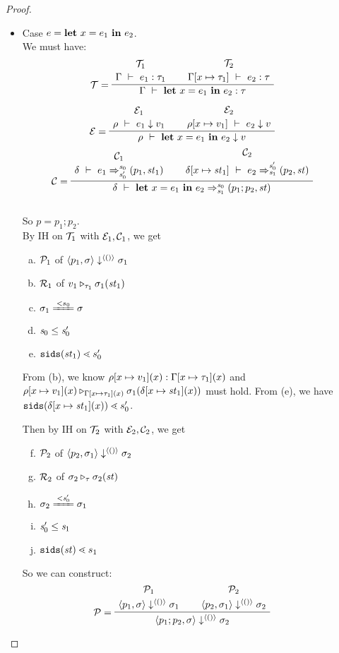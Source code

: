 \begin{proof}
\begin{itemize}
 
 \item \label{case-let} Case $e = \mathbf{let} \ x = e_1 \ \mathbf{in} \ e_2$. \\[1ex]
 We must have:
 $$\PT{
 	\UCN{\MT_1}{\Type{\Gam}{e_1}{\tau_1}}
 	\UCN{\MT_2}{\Type{\Gam[\Map{x}{\tau_1}]}{e_2}{\tau}}
 	\LeLa{\MT =} 
 	\BC{\Type{\Gam}{\Let{x}{e_1}{e_2}}{\tau}}
 }$$
 
 $$\PT{	
 	\UCN{\ME_1}{\Eval{\rho}{e_1}{v_1}}
 	\UCN{\ME_2}{\Eval{\rho[\Map{x}{v_1}]}{e_2}{v}}
 	\LeLa{\ME =} 
 	\BC{\Eval{\rho}{\Let{x}{e_1}{e_2}}{v}}
 }$$ 
 $$\PT{\UCN{\MC_1}{\Trans{\del}{e_1}{\s_0}{\s_0'}{\sfun{p_1}{\st_1}}}
 	\UCN{\MC_2}{\Trans{\del[x \|-> {\st_1}]}{e_2}{\s_0'}{\s_1}{\sfun {p_2} {\st}}}
 	\LeLa{\MC = }
 	\BC{\Trans{\del}{\Let{x}{e_1}{e_2}}{\s_0}{\s_1}{\sfun {p_1;p_2} {\st}}}
 }$$\\[1ex]
 
 So $p = p_1;p_2$. \\
 
 By IH on $\mathcal{T}_1$ with $\mathcal{E}_1,\mathcal{C}_1$, we get 
 \begin{enumerate}[(a)]
 	\item $\mathcal{P}_1$ of $\left\langle p_1,\sigma \right\rangle \downarrow^{\langle () \rangle} \sigma_1$
 	\item $\mathcal{R}_1$ of $v_1 \triangleright_{\tau_1} \sigma_1(\mathit{st}_1)$
 	\item $\sgm_1 \ConEq{s_0} \sgm$ 
 	\item $\mathit{s}_0 \le \mathit{s}_0'$
 	\item $\sids{\st_1} \.< {s_0'}$
 \end{enumerate}
 
  From (b), we know $\rho[x \mapsto v_1](x) : \Gamma[x \mapsto \tau_1](x)$ and  $\rho[x \mapsto v_1](x) \triangleright_{\Gamma[x \mapsto \tau_1](x)} \sigma_1(\delta[x \mapsto \mathit{st}_1](x))$ must hold. 
  From (e), we have $\sids{\delta[\Map{x}{\st_1}](x)} \.< s_0'$. 
 
 Then by IH on  $\mathcal{T}_2$ with $\mathcal{E}_2,\mathcal{C}_2$, we get
 \begin{enumerate}	[(a)]
 	\setcounter{enumi}{5}
 	\item $\mathcal{P}_2$ of $\left\langle p_2,\sigma_1 \right\rangle \downarrow^{\langle () \rangle} \sigma_2$ 
 	\item $\mathcal{R}_2$ of $ \sigma_2 \triangleright_{\tau} \sigma_2(\mathit{st})$
    \item $\sgm_2 \ConEq{\s_0'} \sgm_1$
    \item $\mathit{s}_0' \le \mathit{s}_1$
    \item $\sids{\st} \.< {s_1}$
\end{enumerate}

 So we can construct:  
 $$\PT{
 	\UCN{\MP_1}{\seval{p_1}{\sgm}{\vunit}{\sgm_1}}
 	\UCN{\MP_2}{\seval{p_2}{\sgm_1}{\vunit}{\sgm_2}}
 	\LeLa{\MP = }	
 	\BC{\seval{p_1;p_2}{\sgm}{\vunit}{\sgm_2}}
 }$$


\end{itemize}
\end{proof}
